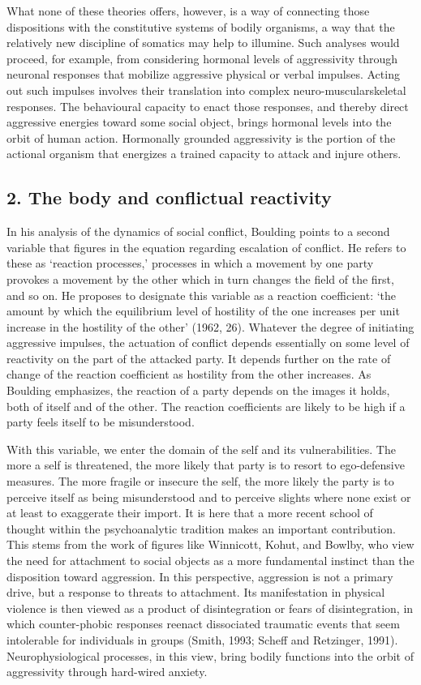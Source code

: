 What none of these theories offers, however, is a way of connecting those dispositions with the constitutive systems of bodily organisms, a way that the relatively new discipline of somatics may help to illumine. Such analyses would proceed, for example, from considering hormonal levels of aggressivity through neuronal responses that mobilize aggressive physical or verbal impulses. Acting out such impulses involves their translation into complex neuro-muscularskeletal responses. The behavioural capacity to enact those responses, and thereby direct aggressive energies toward some social object, brings hormonal levels into the orbit of human action. Hormonally grounded aggressivity is the portion of the actional organism that energizes a trained capacity to attack and injure others.

\subsection*{2. The body and conflictual reactivity}

In his analysis of the dynamics of social conflict, Boulding points to a second variable that figures in the equation regarding escalation of conflict. He refers to these as `reaction processes,' processes in which a movement by one party provokes a movement by the other which in turn changes the field of the first, and so on. He proposes to designate this variable as a reaction coefficient: `the amount by which the equilibrium level of hostility of the one increases per unit increase in the hostility of the other' (1962, 26). Whatever the degree of initiating aggressive impulses, the actuation of conflict depends essentially on some level of reactivity on the part of the attacked party. It depends further on the rate of change of the reaction coefficient as hostility from the other increases. As Boulding emphasizes, the reaction of a party depends on the images it holds, both of itself and of the other. The reaction coefficients are likely to be high if a party feels itself to be misunderstood.

With this variable, we enter the domain of the self and its vulnerabilities. The more a self is threatened, the more likely that party is to resort to ego-defensive measures. The more fragile or insecure the self, the more likely the party is to perceive itself as being misunderstood and to perceive slights where none exist or at least to exaggerate their import. It is here that a more recent school of thought within the psychoanalytic tradition makes an important contribution. This stems from the work of figures like Winnicott, Kohut, and Bowlby, who view the need for attachment to social objects as a more fundamental instinct than the disposition toward aggression. In this perspective, aggression is not a primary drive, but a response to threats to attachment. Its manifestation in physical violence is then viewed as a product of disintegration or fears of disintegration, in which counter-phobic responses reenact dissociated traumatic events that seem intolerable for individuals in groups (Smith, 1993; Scheff and Retzinger, 1991). Neurophysiological processes, in this view, bring bodily functions into the orbit of aggressivity through hard-wired anxiety.

